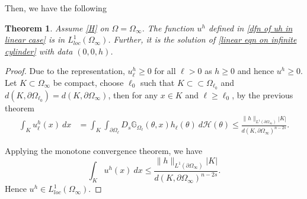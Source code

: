 \documentclass{amsart}
\newtheorem{theorem}{Theorem}[section]
\newcommand{\gk}[1]{\mathbb{G}_{#1}}
\newcommand{\Ds}{D_{s}}
\newcommand{\ul}{u_{\ell}}
\begin{document}
Then, we have the following
 \begin{theorem}\label{thrm for operator blowup}
    Assume \ref{H} on $\Omega=\Omega_{\infty}$. The function $u^{h}$ defined in \eqref{dfn of uh in linear case} is in $L^{1}_{loc}(\Omega_{\infty})$. Further, it is the solution of \eqref{linear eqn on infinite cylinder} with data $(0,0,h)$.
\end{theorem}
\begin{proof}
 Due to the representation, $\ul^{h}\geq0$ for all $\ell>0$ as $h\geq 0$ and hence $u^{h}\geq 0$. Let $K\subset \Omega_{\infty}$ be compact, choose $\ell_{0}$ such that $K\subset\subset \Omega_{\ell_{0}}$ and $d(K,\partial\Omega_{\ell_{0}})=d(K,\partial\Omega_{\infty})$, then for any $x\in K$ and $\ell\geq \ell_{0}$, by the previous theorem 
    \begin{equation*}
    \begin{split}
        \int_{K}\ul^{h}(x)\ dx&= \int_{K}\int_{\partial\Omega_{\ell}}\Ds\gk{\Omega_{\ell}}(\theta,x) h_{\ell}(\theta)\ d\mathcal{H}(\theta) \leq \frac{\|h\|_{L^{1}(\partial\Omega_{\infty})}|K|}{d(K,\partial\Omega_{\infty})^{n-2s}}.
        \end{split}
    \end{equation*}

        Applying the monotone convergence theorem, we have
        \begin{equation*}
            \int_{K}u^{h}(x)\ dx\leq \frac{\|h\|_{L^{1}(\partial\Omega_{\infty})}|K|}{d(K,\partial\Omega_{\infty})^{n-2s}}.
        \end{equation*}
Hence $u^{h}\in L^{1}_{loc}(\Omega_{\infty})$.


\end{proof}
\end{document}
